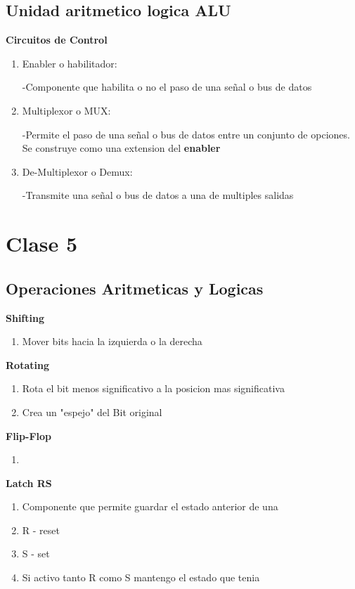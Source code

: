 \documentclass{article}
\begin{document}
        \subsection{Unidad aritmetico logica ALU}
        \textbf{Circuitos de Control}
        \begin{enumerate}
            \item Enabler o habilitador: \begin{center}
                 -Componente que habilita o no el paso de una señal o bus de datos
            
            \end{center}
            \item Multiplexor o MUX:  \begin{center}
                -Permite el paso de una señal o bus de datos entre un conjunto de opciones. 
                Se construye como una extension del \textbf{enabler}
            \end{center}
            \item De-Multiplexor o Demux: \begin{center}
                -Transmite una señal o bus de datos a una de multiples salidas
            \end{center}
        \end{enumerate}
        \section*{Clase 5}
        \subsection*{Operaciones Aritmeticas y Logicas}
        \textbf{Shifting}
        \begin{enumerate}
            \item Mover bits hacia la izquierda o la derecha
        \end{enumerate}
        \textbf{Rotating}
        \begin{enumerate}
            \item Rota el bit menos significativo a la posicion mas significativa
            \item Crea un "espejo" del Bit original
        \end{enumerate}
        \textbf{Flip-Flop}
        \begin{enumerate}
            \item 
        \end{enumerate}
        \textbf{Latch RS}
        \begin{enumerate}
            \item Componente que permite guardar el estado anterior de una
            \item R - reset 
            \item S - set
            \item Si activo tanto R como S mantengo el estado que tenia
        \end{enumerate}
\end{document}
